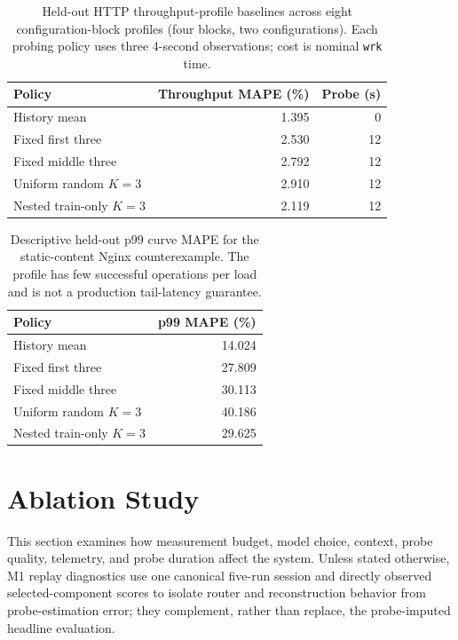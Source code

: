 \documentclass[sigconf, review, anonymous, balance=false]{acmart}
\begin{document}
\begin{table}[t]
\centering
\caption{Held-out HTTP throughput-profile baselines across eight configuration-block profiles (four blocks, two configurations). Each probing policy uses three 4-second observations; cost is nominal \texttt{wrk} time.}
\label{tab:http-profile-baselines}
\small
\setlength{\tabcolsep}{4pt}
\begin{tabular}{lrr}
\toprule
\textbf{Policy} & \textbf{Throughput MAPE (\%)} & \textbf{Probe (s)} \\
\midrule
History mean & 1.395 & 0 \\
Fixed first three & 2.530 & 12 \\
Fixed middle three & 2.792 & 12 \\
Uniform random $K=3$ & 2.910 & 12 \\
Nested train-only $K=3$ & 2.119 & 12 \\
\bottomrule
\end{tabular}
\end{table}

\begin{table}[t]
\centering
\caption{Descriptive held-out p99 curve MAPE for the static-content Nginx counterexample. The profile has few successful operations per load and is not a production tail-latency guarantee.}
\label{tab:http-p99-baselines}
\small
\begin{tabular}{lr}
\toprule
\textbf{Policy} & \textbf{p99 MAPE (\%)} \\
\midrule
History mean & 14.024 \\
Fixed first three & 27.809 \\
Fixed middle three & 30.113 \\
Uniform random $K=3$ & 40.186 \\
Nested train-only $K=3$ & 29.625 \\
\bottomrule
\end{tabular}
\end{table}

\section{Ablation Study}
\label{subsec:ablation-diagnostics}
This section examines how measurement budget, model choice, context, probe quality, telemetry, and probe duration affect the system. Unless stated otherwise, M1 replay diagnostics use one canonical five-run session and directly observed selected-component scores to isolate router and reconstruction behavior from probe-estimation error; they complement, rather than replace, the probe-imputed headline evaluation.
\end{document}
